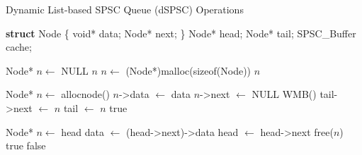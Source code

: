 \begin{algorithm}[!ht]
    \centering
    \captionsetup{justification=centering}
    \caption{Dynamic List-based SPSC Queue (dSPSC) Operations \cite{torquati2010singleproducersingleconsumerqueuessharedcache}}
    \label{alg:dspsc-detailed}
    \scriptsize
    \begin{algorithmic}[1]
        \State \textbf{struct} Node \{ void* data; Node* next; \}
        \State Node* head; 
        \State Node* tail; 
        \State SPSC\_Buffer cache; 
        
        \State
        
            \State Node* $n \gets$ NULL
             
                \State \Return $n$
            \EndIf
            \State $n \gets$ (Node*)malloc(sizeof(Node))
            \State \Return $n$
        \EndFunction
        
        \State
        
            \State Node* $n \gets$ allocnode() 
            \State $n$->data $\gets$ data
            \State $n$->next $\gets$ NULL
            \State WMB() 
            \State tail->next $\gets$ $n$ 
            \State tail $\gets$ $n$ 
            \State \Return true
        \EndFunction
        
        \State
        
             
                \State Node* $n \gets$ head 
                \State *data $\gets$ (head->next)->data 
                \State head $\gets$ head->next 
                 
                    \State free($n$) 
                \EndIf
                \State \Return true
            \EndIf
            \State \Return false 
        \EndFunction
    \end{algorithmic}
\end{algorithm}

